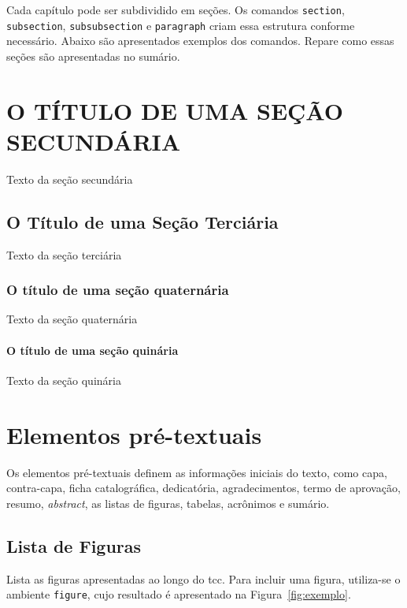 \documentclass{eic-bcc-tcc}
\begin{document}
Cada capítulo pode ser subdividido em seções. Os comandos \texttt{section}, \texttt{subsection}, \texttt{subsubsection} e \texttt{paragraph} criam essa estrutura conforme necessário. Abaixo são apresentados exemplos dos comandos. Repare como essas seções são apresentadas no sumário.

\section{O TÍTULO DE UMA SEÇÃO SECUNDÁRIA} %
\label{sec:nome} %
Texto da seção secundária

\subsection{O Título de uma Seção Terciária} %
\label{sub:nome} %
Texto da seção terciária

\subsubsection{O título de uma seção quaternária} %
\label{ssub:nome} %
Texto da seção quaternária

\paragraph{O título de uma seção quinária} %
\label{par:nome} %
Texto da seção quinária


\section{Elementos pré-textuais}
Os elementos pré-textuais definem as informações iniciais do texto, como capa, contra-capa, ficha catalográfica, dedicatória, agradecimentos, termo de aprovação, resumo, \textit{abstract}, as listas de figuras, tabelas, acrônimos e sumário.

\subsection{Lista de Figuras}

Lista as figuras apresentadas ao longo do \gls{tcc}. Para incluir uma figura, utiliza-se o ambiente \verb|figure|, cujo resultado é apresentado na Figura~\ref{fig:exemplo}.
\end{document}
